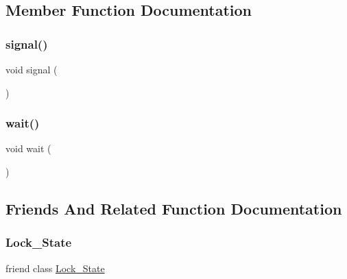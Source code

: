 \subsection{Member Function Documentation}
\mbox{\label{classLock_a2a0f4bfac2f24aa0a07de86141381aec}} 
\subsubsection{\texorpdfstring{signal()}{signal()}}
{\footnotesize\ttfamily void signal (\begin{DoxyParamCaption}{ }\end{DoxyParamCaption})}

\mbox{\label{classLock_aa3b21853f890838c88d047d6c2786917}} 
\subsubsection{\texorpdfstring{wait()}{wait()}}
{\footnotesize\ttfamily void wait (\begin{DoxyParamCaption}{ }\end{DoxyParamCaption})}



\subsection{Friends And Related Function Documentation}
\mbox{\label{classLock_aa4cd56dd42d22d72b90cadc832e52591}} 
\subsubsection{\texorpdfstring{Lock\+\_\+\+State}{Lock\_State}}
{\footnotesize\ttfamily friend class \mbox{\hyperlink{classLock__State}{Lock\+\_\+\+State}}\hspace{0.3cm}{\ttfamily [friend]}}

